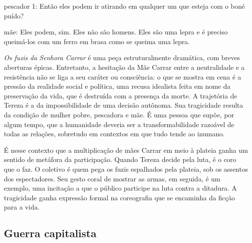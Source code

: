 {\sc pescador} 1: Então eles podem ir atirando em qualquer um que esteja com
o boné puído?

{\sc mãe}: Eles podem, sim. Eles não são homens. Eles são uma lepra e é
preciso queimá-los com um ferro em brasa como se queima uma lepra.

{\it Os fuzis da Senhora Carrar} é uma peça estruturalmente dramática,
com breves aberturas épicas. Entretanto, a hesitação da Mãe Carrar entre
a neutralidade e a resistência não se liga a seu caráter ou consciência:
o que se mostra em cena é a pressão da realidade social e política, uma
recusa idealista feita em nome da preservação da vida, que é destruída
com a presença da morte. A trajetória de Tereza é a da impossibilidade
de uma decisão autônoma. Sua tragicidade resulta da condição de mulher
pobre, pescadora e mãe. É uma pessoa que supõe, por algum tempo, que a
humanidade deveria ser a transformabilidade razoável de todas as
relações, sobretudo em contextos em que tudo tende ao inumano.


É nesse contexto que a multiplicação de mães Carrar em meio à plateia
ganha um sentido de metáfora da participação. Quando Tereza decide pela
luta, é o coro que o faz. O coletivo é quem pega os fuzis espalhados
pela plateia, sob os assentos dos espectadores. Seu gesto coral de
mostrar as armas, em seguida, é um exemplo, uma incitação a que o
público participe na luta contra a ditadura. A tragicidade ganha
expressão formal na coreografia que se encaminha da ficção para a vida.


\subsection{Guerra capitalista}

